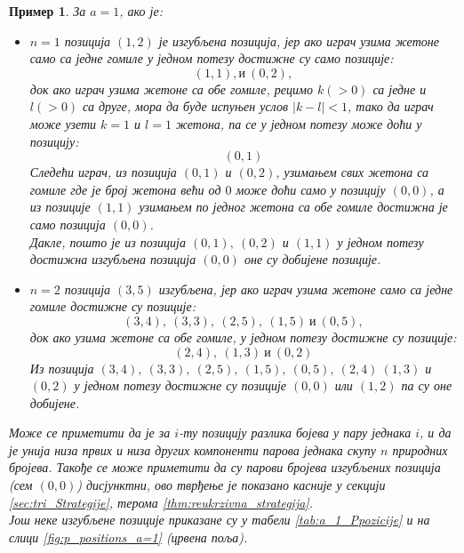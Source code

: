 \documentclass[a4paper]{article}
\newtheorem{example}{Пример}
\begin{document}
\begin{example}
	За $ a = 1 $, ако је:
		\begin{itemize}
			\item $ n = 1  $ позиција $ (1, 2) $ је изгубљена позиција, јер ако играч узима жетоне само са једне гомиле у једном потезу достижне су само позиције:
				\begin{displaymath}
					(1, 1), \text{и}\ (0, 2),
				\end{displaymath}
			док ако играч узима жетоне са обе гомиле, рецимо $ k (> 0) $ са једне и $ l (> 0) $ са друге, мора да буде испуњен услов $ |k - l| < 1 $, тако да играч може узети $ k = 1 $ и $ l = 1 $ жетона, па се у једном потезу може доћи у позицију:
				\begin{displaymath}
					(0, 1)
				\end{displaymath}
			Следећи играч, из позиција $ (0, 1) $ и $ (0, 2) $, узимањем свих жетона са гомиле где је број жетона већи од $ 0 $ може доћи само у позицију $ (0, 0) $, а из позиције $ (1, 1) $ узимањем по једног жетона са обе гомиле достижна је само позиција $ (0, 0) $.\\
			Дакле, пошто је из позиција $ (0, 1),\ (0, 2) $ и $ (1, 1) $ у једном потезу достижна изгубљена позиција $ (0,0) $ оне су добијене позиције.
			\item $ n = 2 $ позиција $ (3, 5) $ изгубљена, јер ако играч узима жетоне само са једне гомиле достижне су позиције:
				\begin{displaymath}
					(3, 4),\ (3, 3),\ (2, 5),\ (1, 5)\  \text{и}\ (0, 5),
				\end{displaymath}
			док ако узима жетоне са обе гомиле, у једном потезу достижне су позиције:
				\begin{displaymath}
					(2, 4),\ (1, 3)\ \text{и}\ (0, 2)
				\end{displaymath}
			Из позиција $ (3, 4),\ (3, 3),\ (2, 5),\ (1, 5),\ (0, 5),\ (2, 4)\ (1, 3) $ и $ (0, 2) $ у једном потезу достижне су позиције $ (0, 0) $ или $ (1, 2) $ па су оне добијене.
		\end{itemize}
		Може се приметити да је за $ i $-ту позицију разлика бојева у пару једнака $ i $, и да је унија низа првих и низа других компоненти парова једнака скупу $ n $ природних бројева. Такође се може приметити да су парови бројева изгубљених позиција (сем $ (0, 0) $) дисјунктни, ово тврђење је показано касније у секцији \ref{sec:tri_Strategije}, терома \ref{thm:reukrzivna_strategija}.\\
		Још неке изгубљене позиције приказане су у табели \ref{tab:a_1_Ppozicije} и на слици \ref{fig:p_positions_a=1} (црвена поља).
\end{example}
	
\end{document}

